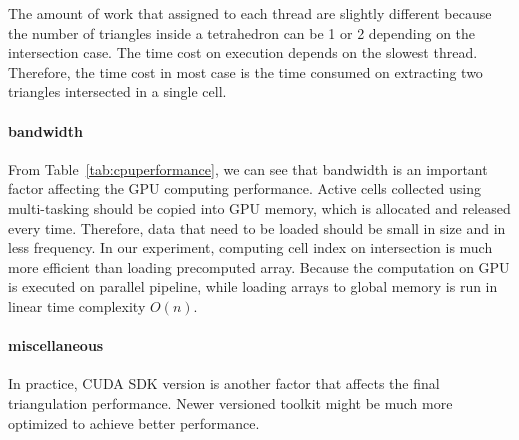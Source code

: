 \documentclass[11pt, b5paper]{report}
\begin{document}
The amount of work that assigned to each thread are slightly different 
because the number of triangles inside a tetrahedron can be 1 or 2 depending on
the intersection case. The time cost on execution depends on the slowest thread.
Therefore, the time cost in most case is the time consumed on extracting two 
triangles intersected in a single cell.

\paragraph{bandwidth}
From Table~\ref{tab:cpuperformance}, we can see that bandwidth is an important 
factor affecting the GPU computing performance. Active cells collected using
multi-tasking should be copied into GPU memory, which is allocated and released
every time. Therefore, data that need to be loaded should be small in size and 
in less frequency. In our experiment, computing cell index on intersection is 
much more efficient than loading precomputed array. Because the computation
on GPU is executed on parallel pipeline, while loading arrays to global 
memory is run in linear time complexity $O(n)$.

\paragraph{miscellaneous}
In practice, CUDA SDK version is another factor that affects the final triangulation
performance. Newer versioned toolkit might be much more optimized to achieve
better performance.



\end{document}
